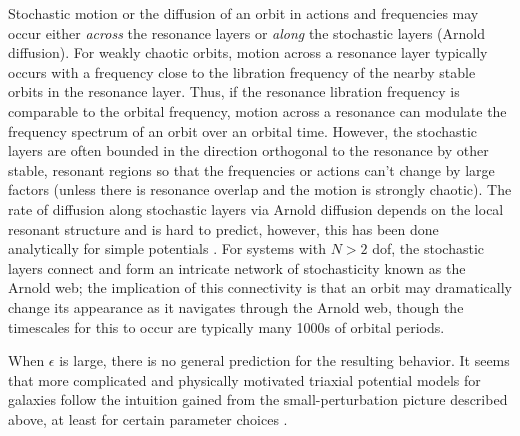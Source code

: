 \documentclass[letterpaper,12pt,preprint]{aastex}
\begin{document}
Stochastic motion or the diffusion of an orbit in actions and frequencies may occur either \emph{across} the resonance layers or \emph{along} the stochastic layers (Arnold diffusion). For weakly chaotic orbits, motion across a resonance layer typically occurs with a frequency close to the libration frequency of the nearby stable orbits in the resonance layer. Thus, if the resonance libration frequency is comparable to the orbital frequency, motion across a resonance can modulate the frequency spectrum of an orbit over an orbital time. However, the stochastic layers are often bounded in the direction orthogonal to the resonance by other stable, resonant regions so that the frequencies or actions can't change by large factors (unless there is resonance overlap and the motion is strongly chaotic). The rate of diffusion along stochastic layers via Arnold diffusion depends on the local resonant structure and is hard to predict, however, this has been done analytically for simple potentials \citep[e.g.,][]{chirikov??}. For systems with $N>2$ dof, the stochastic layers connect and form an intricate network of stochasticity known as the Arnold web; the implication of this connectivity is that an orbit may dramatically change its appearance as it navigates through the Arnold web, though the timescales for this to occur are typically many 1000s of orbital periods.

When $\epsilon$ is large, there is no general prediction for the resulting behavior. It seems that more complicated and physically motivated triaxial potential models for galaxies follow the intuition gained from the small-perturbation picture described above, at least for certain parameter choices \citep{valluri, merritt, dehnen, etc.}. 
\end{document}
